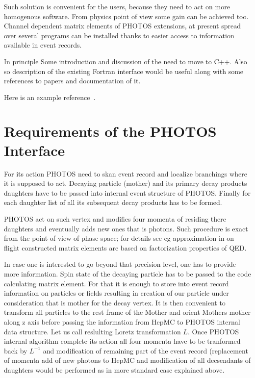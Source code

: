 \documentclass[]{Photos_interface_design}
\begin{document}
Such solution is convenient for the users, because they need to act on more homogenous software. From physics point of view some gain can be achieved too.
Channel dependent matrix elements of PHOTOS extensions, at present spread over
several programs can be  
installed thanks to easier access to information available in event records.

In principle 
Some introduction and discussion of the need to move to C++.
Also so description of the existing Fortran interface would be useful
along with some references to papers and documentation of it.

Here is an example reference~\cite{tauolaC++}.

\section{Requirements of the PHOTOS Interface}
For its action PHOTOS need to skan event record and localize branchings where
it is supposed to act. Decaying particle (mother) and its primary decay products
daughters have to be passed into internal event structure of PHOTOS. 
Finally for each daughter list of all its subsequent decay products has to be 
formed.

PHOTOS act on such vertex and modifies four momenta of residing there daughters 
and eventually adds new ones that is photons. 
Such procedure is exact from the point of view of phase space; for details see eg \cite{Nanava:2006vv} approximation in on flight constructed matrix elements are based
on factorization properties of QED. 

In case one is interested to go beyond that precision level, one has to  provide
more information. Spin state of the decaying particle has to be passed to the code calculating matrix element. For that it is enough to store into event record
information on particles or fields resulting in creation of
our particle under consideration that is mother for the decay vertex.
It is then convenient to transform all particles to the rest frame of the Mother
and orient Mothers mother along z axis before passing the information from HepMC to PHOTOS internal data structure. Let us call reslulting Loretz transformation $L$. Once PHOTOS internal algorithm complete
its action all four momenta have to be tranformed back by $L^{-1}$ and 
modification of remaining part of the event record (replacement of momenta
add of new photons to HepMC and modification of all decsendants of 
daughters would be performed as in more standard case explained above.
\end{document}
